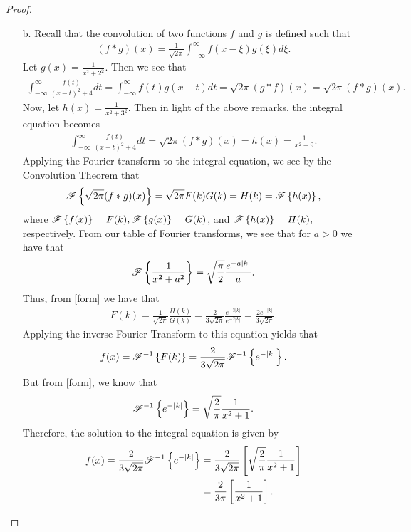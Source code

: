 \begin{proof}
\begin{enumerate}
    \item[b.] Recall that the convolution of two functions $f$ and $g$
      is defined such that
      \begin{align*}
        (f \ast g)(x) = \frac{1}{\sqrt{2\pi}}\int_{-\infty}^\infty f(x-\xi)g(\xi) d\xi.
      \end{align*}
      Let $\displaystyle g(x) = \frac{1}{x^2 + 2^2}$. Then we see that
      \begin{align*}
        \int_{-\infty}^\infty \frac{f(t)}{(x-t)^2 + 4}dt = \int_{-\infty}^\infty f(t) g(x-t)dt
        = \sqrt{2\pi}(g \ast f)(x) = \sqrt{2\pi}(f \ast g)(x).
      \end{align*}
      Now, let $\displaystyle h(x) = \frac{1}{x^2+3^2}$. Then in light of the above remarks, the integral
      equation becomes
      \begin{align*}
        \int_{-\infty}^\infty \frac{f(t)}{(x-t)^2 + 4}dt = \sqrt{2\pi}(f \ast g)(x) = h(x) = \frac{1}{x^2+9}.
      \end{align*}
      Applying the Fourier transform to the integral equation, we see by the Convolution Theorem that
      \begin{align*}
        \mathscr{F}\left\{ {\sqrt{2\pi}(f\ast g)(x)} \right\} = \sqrt{2\pi} F(k)G(k) = H(k) = \mathscr{F}\left\{ {h(x)} \right\},
      \end{align*}
      where $\mathscr{F}\left\{ {f(x)} \right\} = F(k), \mathscr{F}\left\{ {g(x)} \right\} = G(k)$, and $\mathscr{F}\left\{ {h(x)} \right\} = H(k),$ respectively.
      From our table of Fourier transforms, we see
      that for $a>0$ we have that
      \begin{align}\label{form}
        \mathscr{F}\left\{ {\frac{1}{x^2+a^2}} \right\} = \sqrt{\frac{\pi}{2}}\frac{e^{-a|k|}}{a}.
      \end{align}
      Thus, from \eqref{form} we have that
      \begin{align*}
        F(k) = \frac{1}{\sqrt{2\pi}}\frac{H(k)}{G(k)} = \frac{2}{3\sqrt{2\pi}}\frac{e^{-3|k|}}{e^{-2|k|}} = \frac{2e^{-|k|}}{3\sqrt{2\pi}}.
      \end{align*}
      Applying the inverse Fourier Transform to this equation yields that
      \begin{align*}
        f(x) = \mathscr{F}^{-1}\left\{ {F(k)} \right\}= \frac{2}{3\sqrt{2\pi}} \mathscr{F}^{-1}\left\{ {e^{-|k|}} \right\}.
      \end{align*}
      But from \eqref{form}, we know that
      \begin{align*}
        \mathscr{F}^{-1}\left\{ {e^{-|k|}} \right\}= \sqrt{\frac{2}{\pi}} \frac{1}{x^2+1}.
      \end{align*}
      Therefore, the solution to the integral equation is given by
      \begin{align*}
        f(x) = \frac{2}{3\sqrt{2\pi}} \mathscr{F}^{-1}\left\{ {e^{-|k|}} \right\} &= \frac{2}{3\sqrt{2\pi}} \left[\sqrt{\frac{2}{\pi}} \frac{1}{x^2+1}\right]\\
        &= \frac{2}{3\pi} \left[\frac{1}{x^2+1}\right].
      \end{align*}
  \end{enumerate}
\end{proof}
\newpage
